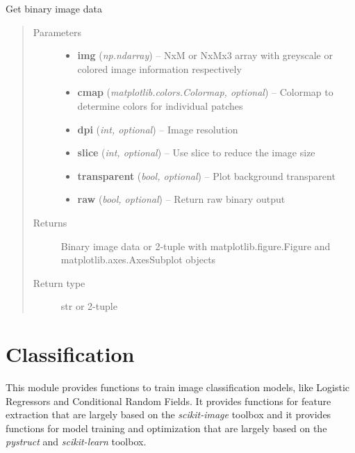 \documentclass[letterpaper,10pt,english]{sphinxmanual}
\begin{document}
\begin{fulllineitems}
\label{segmentation:flamingo.segmentation.plot.plot_image}
Get binary image data
\begin{quote}\begin{description}
\item[{Parameters}] \leavevmode\begin{itemize}
\item {} 
\textbf{img} (\emph{np.ndarray}) -- NxM or NxMx3 array with greyscale or colored image information
respectively

\item {} 
\textbf{cmap} (\emph{matplotlib.colors.Colormap, optional}) -- Colormap to determine colors for individual patches

\item {} 
\textbf{dpi} (\emph{int, optional}) -- Image resolution

\item {} 
\textbf{slice} (\emph{int, optional}) -- Use slice to reduce the image size

\item {} 
\textbf{transparent} (\emph{bool, optional}) -- Plot background transparent

\item {} 
\textbf{raw} (\emph{bool, optional}) -- Return raw binary output

\end{itemize}

\item[{Returns}] \leavevmode
Binary image data or 2-tuple with matplotlib.figure.Figure and
matplotlib.axes.AxesSubplot objects

\item[{Return type}] \leavevmode
str or 2-tuple

\end{description}\end{quote}

\end{fulllineitems}



\section{Classification}
\label{classification::doc}\label{classification:classification}
This module provides functions to train image classification models, like Logistic Regressors and Conditional Random Fields.
It provides functions for feature extraction that are largely based on the \emph{scikit-image} toolbox and
it provides functions for model training and optimization that are largely based on the \emph{pystruct} and \emph{scikit-learn} toolbox.
\end{document}

